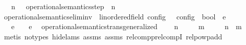 \begin{isabellebody}
\ \ {\isachardoublequoteopen}{\isasymC}\ {\isasymhookrightarrow}\isactrlbsup n\isactrlesup \ {\isasymC}\ {\isasymequiv}\ {\isacharparenleft}operational{\isacharunderscore}semantics{\isacharunderscore}step\ {\isacharcircum}{\isacharcircum}\ n{\isacharparenright}\ {\isasymC}\ {\isasymC}\isanewline
\isanewline
{}\isamarkupfalse%
\ operational{\isacharunderscore}semantics{\isacharunderscore}elim{\isacharunderscore}inv\ {\isacharcolon}{\isacharcolon}\ {\isachardoublequoteopen}{\isacharparenleft}{\isacharprime}{\isasymtau}{\isacharcolon}{\isacharcolon}linordered{\isacharunderscore}field{\isacharparenright}\ config\ {\isasymRightarrow}\ {\isacharprime}{\isasymtau}\ config\ {\isasymRightarrow}\ bool{\isachardoublequoteclose}\ {\isacharparenleft}{\isachardoublequoteopen}{\isacharunderscore}\ {\isasymhookrightarrow}\isactrlsub e\isactrlsup {\isasymleftarrow}\ {\isacharunderscore}{\isachardoublequoteclose}\ {}{}{\isacharparenright}\ \isanewline
\ \ {\isachardoublequoteopen}{\isasymC}\ {\isasymhookrightarrow}\isactrlsub e\isactrlsup {\isasymleftarrow}\ {\isasymC}\ {\isasymequiv}\ {\isasymC}\ {\isasymhookrightarrow}\isactrlsub e\ {\isasymC}%
\isadelimdocument
%
\endisadelimdocument
%
\isatagdocument
%
\isamarkuptrue%
%
\endisatagdocument
{\isafolddocument}%
%
\isadelimdocument
%
\endisadelimdocument
{}\isamarkupfalse%
\ operational{\isacharunderscore}semantics{\isacharunderscore}trans{\isacharunderscore}generalized{\isacharcolon}\isanewline
\ \ \ {\isachardoublequoteopen}{\isasymC}\ {\isasymhookrightarrow}\isactrlbsup n\isactrlesup \ {\isasymC}\isanewline
\ \ \ {\isachardoublequoteopen}{\isasymC}\ {\isasymhookrightarrow}\isactrlbsup m\isactrlesup \ {\isasymC}\isanewline
\ \ \ {\isachardoublequoteopen}{\isasymC}\ {\isasymhookrightarrow}\isactrlbsup n\ {\isacharplus}\ m\isactrlesup \ {\isasymC}\isanewline
%
\isadelimproof
\ \ %
\endisadelimproof
%
\isatagproof
{}\isamarkupfalse%
\ {\isacharparenleft}metis\ {\isacharparenleft}no{\isacharunderscore}types{\isacharcomma}\ hide{\isacharunderscore}lams{\isacharparenright}\ assms{\isacharparenleft}{}{\isacharparenright}\ assms{\isacharparenleft}{}{\isacharparenright}\ relcompp{\isachardot}relcompI\ relpowp{\isacharunderscore}add{\isacharparenright}%

\end{isabellebody}
